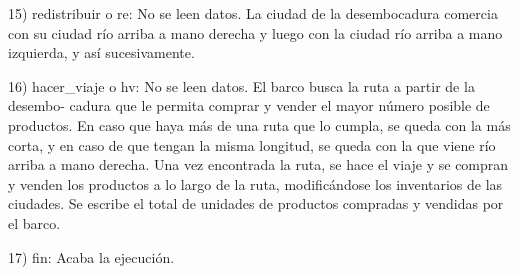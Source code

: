 15) redistribuir o re\+: No se leen datos. La ciudad de la desembocadura comercia con su ciudad río arriba a mano derecha y luego con la ciudad río arriba a mano izquierda, y así sucesivamente.

16) hacer\+\_\+viaje o hv\+: No se leen datos. El barco busca la ruta a partir de la desembo-\/ cadura que le permita comprar y vender el mayor número posible de productos. En caso que haya más de una ruta que lo cumpla, se queda con la más corta, y en caso de que tengan la misma longitud, se queda con la que viene río arriba a mano derecha. Una vez encontrada la ruta, se hace el viaje y se compran y venden los productos a lo largo de la ruta, modificándose los inventarios de las ciudades. Se escribe el total de unidades de productos compradas y vendidas por el barco.

17) fin\+: Acaba la ejecución. 